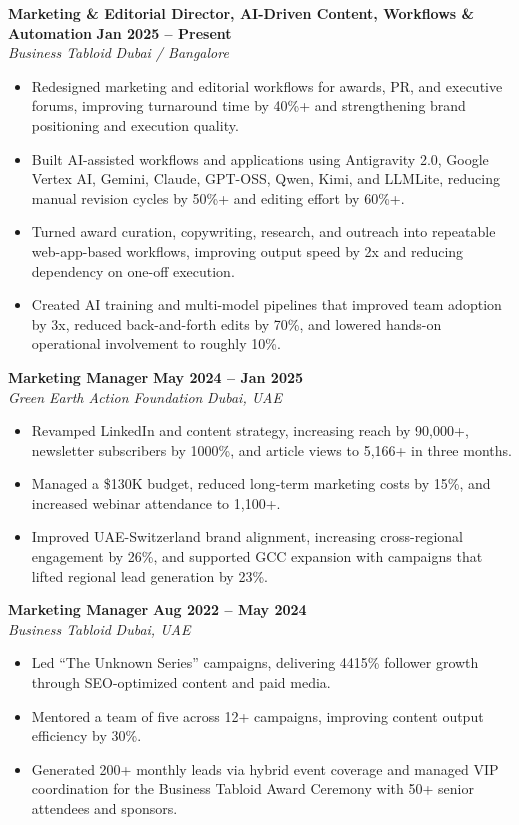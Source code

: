 \documentclass[10.5pt,a4paper]{article}
\begin{document}
\noindent\textbf{Marketing \& Editorial Director, AI-Driven Content, Workflows \& Automation} \hfill \textbf{Jan 2025 -- Present}\\
\textit{Business Tabloid} \hfill \textit{Dubai / Bangalore}
\begin{itemize}[leftmargin=*,nosep,topsep=2pt]
  \item Redesigned marketing and editorial workflows for awards, PR, and executive forums, improving turnaround time by 40\%+ and strengthening brand positioning and execution quality.
  \item Built AI-assisted workflows and applications using Antigravity 2.0, Google Vertex AI, Gemini, Claude, GPT-OSS, Qwen, Kimi, and LLMLite, reducing manual revision cycles by 50\%+ and editing effort by 60\%+.
  \item Turned award curation, copywriting, research, and outreach into repeatable web-app-based workflows, improving output speed by 2x and reducing dependency on one-off execution.
  \item Created AI training and multi-model pipelines that improved team adoption by 3x, reduced back-and-forth edits by 70\%, and lowered hands-on operational involvement to roughly 10\%.
\end{itemize}
\vspace{4pt}

\noindent\textbf{Marketing Manager} \hfill \textbf{May 2024 -- Jan 2025}\\
\textit{Green Earth Action Foundation} \hfill \textit{Dubai, UAE}
\begin{itemize}[leftmargin=*,nosep,topsep=2pt]
  \item Revamped LinkedIn and content strategy, increasing reach by 90,000+, newsletter subscribers by 1000\%, and article views to 5,166+ in three months.
  \item Managed a \$130K budget, reduced long-term marketing costs by 15\%, and increased webinar attendance to 1,100+.
  \item Improved UAE-Switzerland brand alignment, increasing cross-regional engagement by 26\%, and supported GCC expansion with campaigns that lifted regional lead generation by 23\%.
\end{itemize}
\vspace{4pt}

\noindent\textbf{Marketing Manager} \hfill \textbf{Aug 2022 -- May 2024}\\
\textit{Business Tabloid} \hfill \textit{Dubai, UAE}
\begin{itemize}[leftmargin=*,nosep,topsep=2pt]
  \item Led ``The Unknown Series'' campaigns, delivering 4415\% follower growth through SEO-optimized content and paid media.
  \item Mentored a team of five across 12+ campaigns, improving content output efficiency by 30\%.
  \item Generated 200+ monthly leads via hybrid event coverage and managed VIP coordination for the Business Tabloid Award Ceremony with 50+ senior attendees and sponsors.
\end{itemize}
\vspace{4pt}
\end{document}
